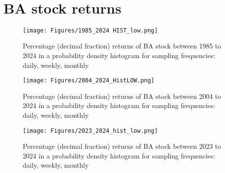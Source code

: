 \documentclass[
	a4paper, %
	11pt, %
	twoside, %
]{LTJournalArticle}
\begin{document}



\printbibliography %
 

\newpage

\


\newpage

\onecolumn

\appendix
\section{BA stock returns}
\label{App:A}
\begin{figure}[ht]
	\centering
	\texttt{[image: Figures/1985\_2024 HIST\_low.png]}
	\caption{Percentage (decimal fraction) returns of BA stock between 1985 to 2024 in a probability density histogram for sampling frequencies: daily, weekly, monthly}
	\label{fig:DR_1985}

	\texttt{[image: Figures/2004\_2024\_HistLOW.png]}
	\caption{Percentage (decimal fraction) returns of BA stock between 2004 to 2024 in a probability density histogram for sampling frequencies: daily, weekly, monthly}
	\label{fig:DR_2004}

	\texttt{[image: Figures/2023\_2024\_hist\_low.png]}
	\caption{Percentage (decimal fraction) returns of BA stock between 2023 to 2024 in a probability density histogram for sampling frequencies: daily, weekly, monthly}
	\label{fig:DR_2023}
\end{figure}

\newpage
\end{document}
